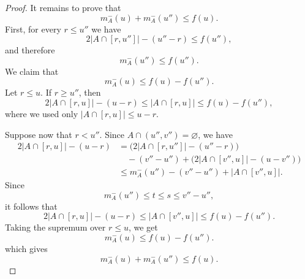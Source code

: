 \documentclass[10pt,a4paper]{amsart}
\def\F#1{f(#1)}
\begin{document}
\begin{proof}
    It remains to prove that
    $$
        m_A^-(u)+m_A^-(u'')\leq \F{u}.
    $$
    First, for every $r\leq u''$ we have
    $$
        2|A\cap[r,u'']|-(u''-r)\leq \F{u''},
    $$
    and therefore
    $$
        m_A^-(u'')\leq \F{u''}.
    $$
    We claim that
    $$
        m_A^-(u)\leq \F{u}-\F{u''}.
    $$
    Let $r\leq u$. If $r\geq u''$, then
    $$
        2|A\cap[r,u]|-(u-r)
        \leq |A\cap[r,u]|
        \leq \F{u}-\F{u''},
    $$
    where we used only $|A\cap[r,u]|\leq u-r$.

    Suppose now that $r<u''$. Since $A\cap(u'',v'')=\varnothing$, we have
    \begin{align*}
        2|A\cap[r,u]|-(u-r)
        &=
        \bigl(2|A\cap[r,u'']|-(u''-r)\bigr)\\
        &\quad
        -(v''-u'')
        +\bigl(2|A\cap[v'',u]|-(u-v'')\bigr)\\
        &\leq
        m_A^-(u'')-(v''-u'')+|A\cap[v'',u]|.
    \end{align*}
    Since
    $$
        m_A^-(u'')\leq t\leq s\leq v''-u'',
    $$
    it follows that
    $$
        2|A\cap[r,u]|-(u-r)
        \leq |A\cap[v'',u]|
        \leq \F{u}-\F{u''}.
    $$
    Taking the supremum over $r\leq u$, we get
    $$
        m_A^-(u)\leq \F{u}-\F{u''}.
    $$
which gives
    $$
        m_A^-(u)+m_A^-(u'')\leq \F{u}.
    $$
\end{proof}
\end{document}
